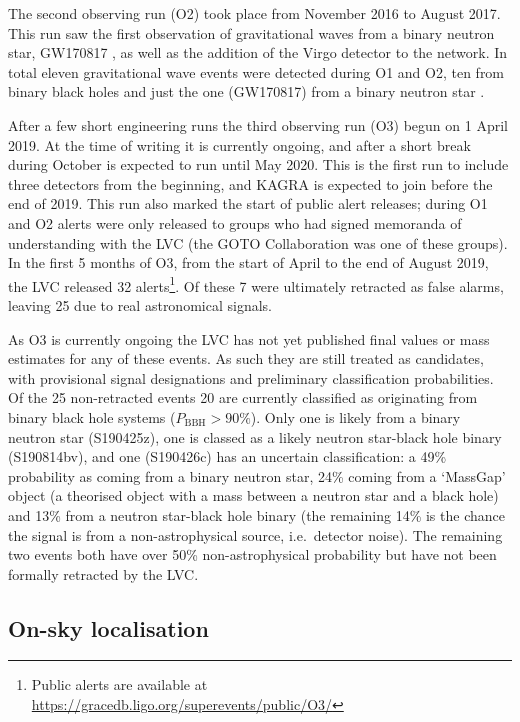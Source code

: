 \begin{colsection}
\begin{colsection}
\newpage

The second observing run (O2)  took place from November 2016 to August 2017. This run saw the first observation of gravitational waves from a binary neutron star, GW170817 \citep{GW170817}, as well as the addition of the Virgo detector to the network. In total eleven gravitational wave events were detected during O1 and O2, ten from binary black holes and just the one (GW170817) from a binary neutron star \citep{GW_catalog}.

After a few short engineering runs the third observing run (O3)  begun on 1 April 2019. At the time of writing it is currently ongoing, and after a short break during October is expected to run until May 2020. This is the first run to include three detectors from the beginning, and KAGRA is expected to join before the end of 2019. This run also marked the start of public alert releases; during O1 and O2 alerts were only released to groups who had signed memoranda of understanding with the LVC (the GOTO Collaboration was one of these groups). In the first 5 months of O3, from the start of April to the end of August 2019, the LVC released 32 alerts\footnote{Public alerts are available at \url{https://gracedb.ligo.org/superevents/public/O3/}}. Of these 7 were ultimately retracted as false alarms, leaving 25 due to real astronomical signals.

As O3 is currently ongoing the LVC has not yet published final values or mass estimates for any of these events. As such they are still treated as candidates, with provisional signal designations and preliminary classification probabilities. Of the 25 non-retracted events 20 are currently classified as originating from binary black hole systems ($P_\text{BBH}>90\%$). Only one is likely from a binary neutron star (S190425z), one is classed as a likely neutron star-black hole binary (S190814bv), and one (S190426c) has an uncertain classification: a 49\% probability as coming from a binary neutron star, 24\% coming from a `MassGap' object (a theorised object with a mass between a neutron star and a black hole) and 13\% from a neutron star-black hole binary (the remaining 14\% is the chance the signal is from a non-astrophysical source, i.e.\ detector noise). The remaining two events both have over 50\% non-astrophysical probability but have not been formally retracted by the LVC.\@

\end{colsection}

\newpage
\subsection{On-sky localisation}
\label{sec:gw_localisation}
\begin{colsection}


\end{colsection}
\end{colsection}
